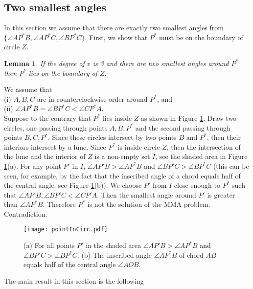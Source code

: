 \documentclass[10pt]{article}
\newtheorem{lemma}[theorem]{Lemma}
\newenvironment{proof}{\begingroup\Proof}{\qed\endgroup}
\def\Proof{\noindent{\bf Proof\/:}\nobreak}
\def\qed{\unskip~{\vrule height 4pt depth 0pt width 4pt}\medbreak}
\begin{document}
\subsection{Two smallest angles} \label{twomin}

In this section we assume that there are exactly two smallest angles from $\{\angle AP^*B, \angle  AP^*C, \angle BP^*C\}$. First, we show that $P^*$ must be on the boundary of circle $Z$. 

\begin{lemma} \label{lemma2angles}
If the degree of $v$ is 3 and there are two smallest angles around $P^*$ then $P^*$ lies on the boundary of $Z$. 
\end{lemma}

\begin{proof}
We assume that \\
(i) $A,B,C$ are in counterclockwise order around $P^*$, and \\
(ii) $\angle AP^*B=\angle BP^*C<\angle CP^*A$.\\
Suppose to the contrary that $P^*$ lies inside $Z$ as shown in Figure \ref{pointInCirc}.
Draw two circles, one passing through points $A,B,P^*$ and the second passing through points $B,C,P^*$. Since these circles intersect by two points $B$ and $P^*$, then their interiors intersect by a lune. 
Since $P^*$ is inside circle $Z$, then the intersection of the lune and the interior of $Z$ is  a non-empty set $I$, see the shaded area in Figure \ref{pointInCirc}(a).
For any point $P'$ in $I$, $\angle AP'B>\angle AP^*B$ and $\angle BP'C>\angle BP^*C$ 
(this can be seen, for example, by the fact that the inscribed angle of a chord equals half of the central angle, see Figure \ref{pointInCirc}(b)).
We choose $P'$ from $I$ close enough to $P^*$ such that $\angle AP'B,\angle BP'C<\angle CP'A$. Then the smallest angle around $P'$ is greater than $\angle AP^*B$. 
Therefore $P^*$ is not the solution of the MMA problem. Contradiction.
\end{proof}
 
\begin{figure}[htp]
\centering
\texttt{[image: pointInCirc.pdf]}
\caption{(a) For all points $P'$ in the shaded area $\angle AP'B>\angle AP^*B$ and $\angle BP'C>\angle BP^*C$.  (b)  The inscribed angle $\angle AP^*B$ of chord $AB$ equals half of the central angle $\angle AOB$.}
\label{pointInCirc}
\end{figure}

The main result in this section is the following
\end{document}
